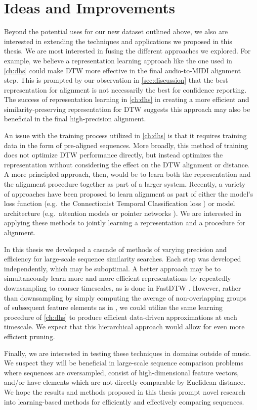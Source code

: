 \section{Ideas and Improvements}
\label{sec:ideas}

Beyond the potential uses for our new dataset outlined above, we also are interested in extending the techniques and applications we proposed in this thesis.
We are most interested in fusing the different approaches we explored.
For example, we believe a representation learning approach like the one used in \cref{ch:dhs} could make DTW more effective in the final audio-to-MIDI alignment step.
This is prompted by our observation in \cref{sec:discussion} that the best representation for alignment is not necessarily the best for confidence reporting.
The success of representation learning in \cref{ch:dhs} in creating a more efficient and similarity-preserving representation for DTW suggests this approach may also be beneficial in the final high-precision alignment.

An issue with the training process utilized in \cref{ch:dhs} is that it requires training data in the form of pre-aligned sequences.
More broadly, this method of training does not optimize DTW performance directly, but instead optimizes the representation without considering the effect on the DTW alignment or distance.
A more principled approach, then, would be to learn both the representation and the alignment procedure together as part of a larger system.
Recently, a variety of approaches have been proposed to learn alignment as part of either the model's loss function (e.g.\ the Connectionist Temporal Classification loss \cite{graves2006connectionist}) or model architecture (e.g.\ attention models \cite{bahdanau2014neural} or pointer networks \cite{vinyals2015pointer}).
We are interested in applying these methods to jointly learning a representation and a procedure for alignment.

In this thesis we developed a cascade of methods of varying precision and efficiency for large-scale sequence similarity searches.
Each step was developed independently, which may be suboptimal.
A better approach may be to simultaneously learn more and more efficient representations by repeatedly downsampling to coarser timescales, as is done in FastDTW \cite{salvador2007toward}.
However, rather than downsampling by simply computing the average of non-overlapping groups of subsequent feature elements as in \cite{salvador2007toward}, we could utilize the same learning procedure of \cref{ch:dhs} to produce efficient data-driven approximations at each timescale.
We expect that this hierarchical approach would allow for even more efficient pruning.

Finally, we are interested in testing these techniques in domains outside of music.
We suspect they will be beneficial in large-scale sequence comparison problems where sequences are oversampled, consist of high-dimensional feature vectors, and/or have elements which are not directly comparable by Euclidean distance.
We hope the results and methods proposed in this thesis prompt novel research into learning-based methods for efficiently and effectively comparing sequences.
